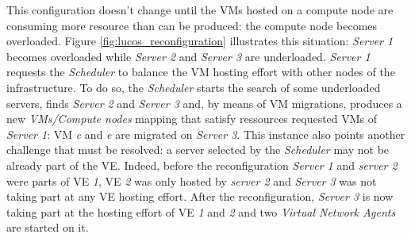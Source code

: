 \newpage

This configuration doesn't change until the VMs hosted on a compute node are
consuming more resource than can be produced: the compute node becomes 
overloaded. Figure \ref{fig:lucos_reconfiguration} illustrates this situation: 
\emph{Server 1} becomes overloaded while \emph{Server 2} and \emph{Server 3} are
underloaded. \emph{Server 1} requests the \emph{Scheduler} to balance the VM 
hosting effort with other nodes of the infrastructure. To do so, the 
\emph{Scheduler} starts the search of some underloaded servers, finds 
\emph{Server 2} and \emph{Server 3} and, by means of VM migrations, produces a 
new \emph{VMs/Compute nodes} mapping that satisfy ressources requested VMs of
\emph{Server 1}: VM \emph{c} and \emph{e} are migrated on \emph{Server 3}. This
instance also points another challenge that must be resolved: a server selected 
by the \emph{Scheduler} may not be already part of the VE. Indeed, before the 
reconfiguration \emph{Server 1} and \emph{server 2} were parts of VE \emph{1},
VE \emph{2} was only hosted by \emph{server 2} and \emph{Server 3} was not 
taking part at any VE hosting effort. After the reconfiguration, \emph{Server 3} 
is now taking part at the hosting effort of VE \emph{1} and \emph{2} and two 
\emph{Virtual Network Agents} are started on it.









